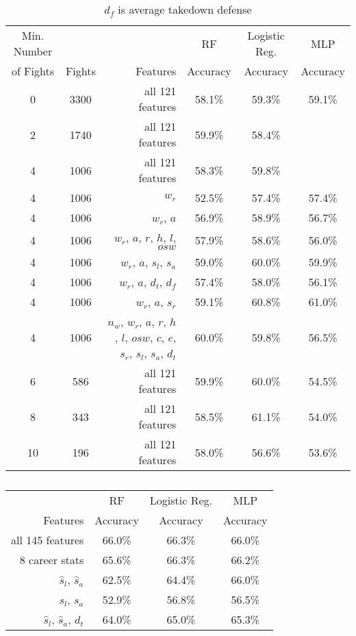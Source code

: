 \begin{center}
\begin{table}[h]
\begin{tabular}{ccr|ccc}
\toprule
Min. Number &        &         & RF        & Logistic Reg. & MLP      \\
of Fights & Fights & Features & Accuracy & Accuracy      & Accuracy\\
\hline
0  & 3300 & all 121 features & 58.1\% & 59.3\% & 59.1\% \\
2  & 1740 & all 121 features & 59.9\% & 58.4\% &  \\
4  & 1006 & all 121 features & 58.3\% & 59.8\% &   \\
4  & 1006 & $w_r$ & 52.5\% & 57.4\% & 57.4\%  \\
4  & 1006 & $w_r$, $a$ & 56.9\% & 58.9\% & 56.7\%  \\
4  & 1006 & $w_r$, $a$, $r$, $h$, $l$, $osw$ & 57.9\% & 58.6\% & 56.0\%\\
4  & 1006 & $w_r$, $a$, $s_l$, $s_a$ & 59.0\% & 60.0\% & 59.9\%  \\
4  & 1006 & $w_r$, $a$, $d_t$, $d_f$ & 57.4\% & 58.0\% & 56.1\%  \\
4  & 1006 & $w_r$, $a$, $s_r$ & 59.1\% & 60.8\% & 61.0\%  \\
4  & 1006 & $n_w$, $w_r$, $a$, $r$, $h$, $l$, $osw$, $c$, $e$, $s_r$, $s_l$, $s_a$, $d_t$ & 60.0\% & 59.8\% & 56.5\%  \\
6  &  586 & all 121 features & 59.9\% & 60.0\% & 54.5\% \\
8  &  343 & all 121 features & 58.5\% & 61.1\% & 54.0\% \\
10 &  196 & all 121 features & 58.0\% & 56.6\% & 53.6\% \\
\bottomrule
\end{tabular}
\caption{$d_f$ is average takedown defense}
\label{other_features}
\end{table}
\end{center}


\begin{center}
\begin{table}[h]
\begin{tabular}{r|ccc}
\toprule
         & RF       & Logistic Reg. & MLP     \\
Features & Accuracy & Accuracy      & Accuracy\\
\hline
all 145 features & 66.0\% & 66.3\% & 66.0\% \\
8 career stats & 65.6\% & 66.3\% & 66.2\% \\
$\hat{s}_l$, $\hat{s}_a$ & 62.5\% & 64.4\% & 66.0\% \\
$s_l$, $s_a$ & 52.9\% & 56.8\% & 56.5\% \\
$\hat{s}_l$, $\hat{s}_a$, $d_t$ & 64.0\% & 65.0\% & 65.3\% \\
\bottomrule
\end{tabular}
\caption{}
\label{other_features}
\end{table}
\end{center}




